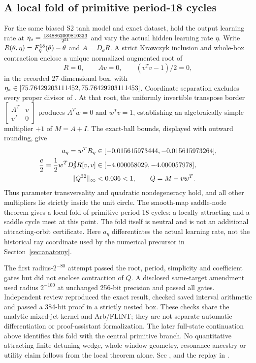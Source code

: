 \documentclass[11pt,letterpaper]{article}
\begin{document}
\subsection{A local fold of primitive period-18 cycles}
\label{sec:fold-proof}

For the same biased S2 tanh model and exact dataset, hold the output learning rate at
$\eta_o=\frac{1848862009810323}{2^{51}}$ and vary the actual hidden learning rate $\eta$.
Write $R(\theta,\eta)=F_\eta^{18}(\theta)-\theta$ and $A=D_\theta R$.
A strict Krawczyk inclusion and whole-box contraction enclose a unique normalized augmented root of
\begin{equation}
R=0,\qquad Av=0,\qquad (v^Tv-1)/2=0,
\end{equation}
in the recorded 27-dimensional box, with $\eta_*\in[75.76429203111452, 75.76429203111453]$. Coordinate separation excludes every proper divisor
of \nPEighteenPeriod{}. At that root, the uniformly invertible transpose border
$\left[\begin{smallmatrix}A^T&v\\v^T&0\end{smallmatrix}\right]$
produces $A^Tw=0$ and $w^Tv=1$, establishing an algebraically simple multiplier $+1$ of $M=A+I$.
The exact-ball bounds, displayed with outward rounding, give
\begin{equation}
\begin{aligned}
a_\eta=w^T R_\eta&\in[-0.015615973444, -0.015615973264],\\
\frac{c}{2}=\frac12w^T D_\theta^2R[v,v]&\in[-4.000058029, -4.000057978],\\
\|Q^{32}\|_\infty&<0.036<1,\qquad Q=M-vw^T.
\end{aligned}
\end{equation}
Thus parameter transversality and quadratic nondegeneracy hold, and all other multipliers lie strictly
inside the unit circle. The smooth-map saddle-node theorem gives a local fold of primitive period-18
cycles: a locally attracting and a saddle cycle meet at this point. The fold itself is neutral and is
not an additional attracting-orbit certificate. Here $a_\eta$ differentiates the actual learning rate,
not the historical ray coordinate used by the numerical precursor in Section~\ref{sec:anatomy}.

The first radius-$2^{-80}$ attempt passed the root, period, simplicity and coefficient gates but did not
enclose contraction of $Q$. A disclosed same-target amendment used radius $2^{-100}$ at unchanged
256-bit precision and passed all gates. Independent review reproduced the exact result, checked saved
interval arithmetic and passed a 384-bit proof in a strictly nested box. These checks share the analytic
mixed-jet kernel and Arb/FLINT; they are not separate automatic differentiation or proof-assistant
formalization. The later full-state continuation above identifies this fold with
the central primitive branch. No quantitative attracting finite-detuning wedge,
whole-window geometry, resonance ancestry or utility claim follows from the local theorem alone.
See ,
 and the replay in
.
\end{document}
